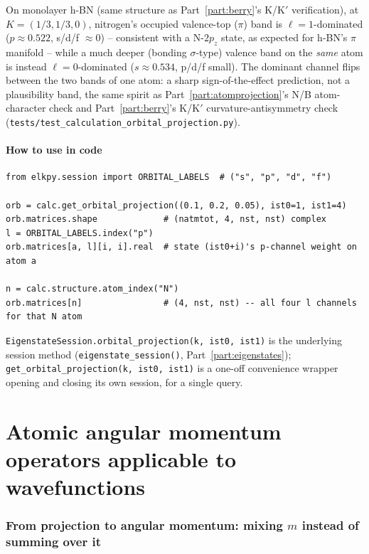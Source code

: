 \documentclass[11pt]{article}
\begin{document}
On monolayer h-BN (same structure as Part~\ref{part:berry}'s K/K$'$ verification), at
$K=(1/3,1/3,0)$, nitrogen's occupied valence-top ($\pi$) band is $\ell=1$-dominated
($p\approx0.522$, s/d/f $\approx0$) -- consistent with a N-$2p_z$ state, as expected for
h-BN's $\pi$ manifold -- while a much deeper (bonding $\sigma$-type) valence band on the
\emph{same} atom is instead $\ell=0$-dominated ($s\approx0.534$, p/d/f small). The
dominant channel flips between the two bands of one atom: a sharp sign-of-the-effect
prediction, not a plausibility band, the same spirit as Part~\ref{part:atomprojection}'s
N/B atom-character check and Part~\ref{part:berry}'s K/K$'$ curvature-antisymmetry check
(\texttt{tests/test\_calculation\_orbital\_projection.py}).

\subsection{How to use in code}

\begin{verbatim}
from elkpy.session import ORBITAL_LABELS  # ("s", "p", "d", "f")

orb = calc.get_orbital_projection((0.1, 0.2, 0.05), ist0=1, ist1=4)
orb.matrices.shape             # (natmtot, 4, nst, nst) complex
l = ORBITAL_LABELS.index("p")
orb.matrices[a, l][i, i].real  # state (ist0+i)'s p-channel weight on atom a

n = calc.structure.atom_index("N")
orb.matrices[n]                # (4, nst, nst) -- all four l channels for that N atom
\end{verbatim}
\texttt{EigenstateSession.orbital\_projection(k, ist0, ist1)} is the underlying session
method (\texttt{eigenstate\_session()}, Part~\ref{part:eigenstates});
\texttt{get\_orbital\_projection(k, ist0, ist1)} is a one-off convenience wrapper opening
and closing its own session, for a single query.

\part{Atomic angular momentum operators applicable to wavefunctions}
\label{part:angularmomentum}

\section{From projection to angular momentum: mixing $m$ instead of summing over it}
\end{document}

